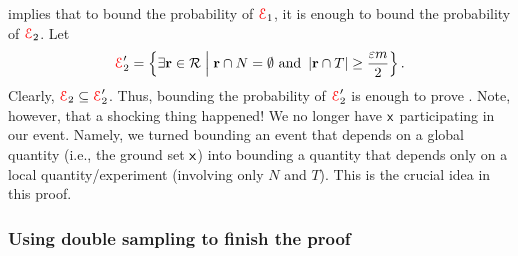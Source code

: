  implies that to bound the probability of ${\textcolor{red}{\EuScript{E}}}_1$,
it is enough to bound the probability of ${\textcolor{red}{\EuScript{E}}}_2$.  Let
\begin{equation*}
    \Event_2'%
    =%
    \Set{ \exists{\range \in \RangeSet} }{\bigl. \range \cap
       N
       = \emptyset \text{ and }\cardin{\range \cap T} \geq
       \frac{\eps m}{2} }.
\end{equation*}
Clearly, ${\textcolor{red}{\EuScript{E}}}_2 \subseteq {\textcolor{red}{\EuScript{E}}}_2'$. Thus, bounding the
probability of ${\textcolor{red}{\EuScript{E}}}_2'$ is enough to prove
. Note, however, that a shocking thing happened!
We no longer have $\mathsf{x}$ participating in our event. Namely, we
turned bounding an event that depends on a global quantity (i.e., the
ground set $\mathsf{x}$) into bounding a quantity that depends only
on a local quantity/experiment (involving only $N$ and $T$).  This is
the crucial idea in this proof.

\subsubsection{Using double sampling to finish the proof}



